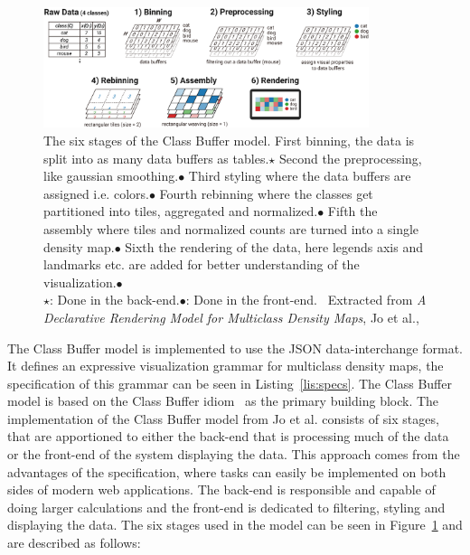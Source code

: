 \begin{figure}
	\centering
	\includegraphics[width=0.85\textwidth]{./figures/Multiclass_Density_Maps-10}
	\caption{The six stages of the Class Buffer model. First binning, the data is split into as many data buffers as tables.$\star$ Second the preprocessing, like gaussian smoothing.$\bullet$ Third styling where the data buffers are assigned i.e. colors.$\bullet$ Fourth rebinning where the classes get partitioned into tiles, aggregated and normalized.$\bullet$ Fifth the assembly where tiles and normalized counts are turned into a single density map.$\bullet$ Sixth the rendering of the data, here legends axis and landmarks etc. are added for better understanding of the visualization.$\bullet$\\$\star$: Done in the back-end.$\bullet$: Done in the front-end. \textcopyright~Extracted from \textit{A Declarative Rendering Model for Multiclass Density Maps}, Jo et al.,~\cite{jo2019declarative}}\label{fig:mdm-stages}
\end{figure}

The Class Buffer model is implemented to use the JSON data-interchange format. It defines an expressive visualization grammar for multiclass density maps, the specification of this grammar can be seen in Listing~\ref{lis:specs}. The Class Buffer model is based on the Class Buffer idiom~\cite{chen2018using} as the primary building block.
The implementation of the Class Buffer model from Jo et al. consists of six stages, that are apportioned to either the back-end that is processing much of the data or the front-end of the system displaying the data. This approach comes from the advantages of the specification, where tasks can easily be implemented on both sides of modern web applications. The back-end is responsible and capable of doing larger calculations and the front-end is dedicated to filtering, styling and displaying the data. The six stages used in the model can be seen in Figure~\ref{fig:mdm-stages} and are described as follows:

